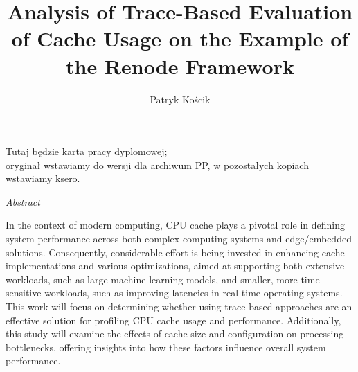 \documentclass[english,masters,a4paper,oneside]{ppfcmthesis}
\author
{%
   Patryk Kościk \album{144635}
}
\title
{%
   Analysis of Trace-Based Evaluation of Cache Usage on the Example of the Renode Framework
}
\begin{document}
\frontmatter\pagestyle{empty}%
\maketitle\cleardoublepage%


\thispagestyle{empty}\vspace*{\fill}%
\begin{center}Tutaj będzie karta pracy dyplomowej;\\oryginał wstawiamy do wersji dla archiwum PP, w pozostałych kopiach wstawiamy ksero.\end{center}%
\vfill\cleardoublepage%



\begin{vplace}

\begin{center}
   \huge{\textit{Abstract}}
\end{center}

In the context of modern computing, CPU cache plays a pivotal role in defining
system performance across both complex computing systems and edge/embedded solutions.
%
Consequently, considerable effort is being invested in enhancing cache
implementations and various optimizations, aimed at supporting both
extensive workloads, such as large machine learning models, and smaller, more
time-sensitive workloads, such as improving latencies in real-time operating
systems.
%
This work will focus on determining whether using trace-based approaches are an
effective solution for profiling CPU cache usage and performance.
%
Additionally, this study will examine the effects of cache size and configuration
on processing bottlenecks, offering insights into how these factors influence
overall system performance.

\end{vplace}

\newpage
\end{document}
